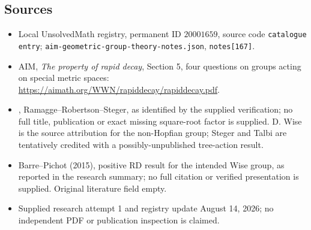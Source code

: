 \documentclass[11pt]{article}
\begin{document}
\subsection{Sources}
\begin{itemize}
\item Local UnsolvedMath registry, permanent ID \(20001659\), source code \texttt{catalogue entry}; \texttt{aim-geometric-group-theory-notes.json}, \texttt{notes[167]}.
\item AIM, \emph{The property of rapid decay}, Section 5, four questions on groups acting on special metric spaces: \url{https://aimath.org/WWN/rapiddecay/rapiddecay.pdf}.
\item [RRS], Ramagge--Robertson--Steger, as identified by the supplied verification; no full title, publication or exact missing square-root factor is supplied. D. Wise is the source attribution for the non-Hopfian group; Steger and Talbi are tentatively credited with a possibly-unpublished tree-action result.
\item Barre--Pichot (2015), positive RD result for the intended Wise group, as reported in the research summary; no full citation or verified presentation is supplied. Original literature field empty.
\item Supplied research attempt 1 and registry update August 14, 2026; no independent PDF or publication inspection is claimed.
\end{itemize}
\end{document}
